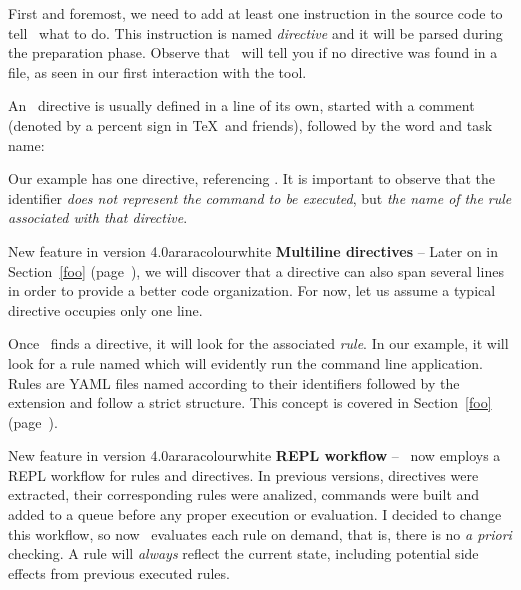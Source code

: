 First and foremost, we need to add at least one instruction in the source code to tell \arara\ what to do. This instruction is named \emph{directive} and it will be parsed during the preparation phase. Observe that \arara\ will tell you if no directive was found in a file, as seen in our first interaction with the tool.

An \arara\ directive is usually defined in a line of its own, started with a comment (denoted by a percent sign in \TeX\ and friends), followed by the word  and task name:


Our example has one directive, referencing . It is important to observe that the  identifier \emph{does not represent the command to be executed}, but \emph{the name of the rule associated with that directive}.

\begin{messagebox}{New feature in version 4.0}{araracolour}{\icinfo}{white}
\textbf{Multiline directives} -- Later on in Section~\ref{foo} (page~\pageref{foo}), we will discover that a directive can also span several lines in order to provide a better code organization. For now, let us assume a typical directive occupies only one line.
\end{messagebox}

Once \arara\ finds a directive, it will look for the associated \emph{rule}. In our example, it will look for a rule named  which will evidently run the  command line application. Rules are YAML files named according to their identifiers followed by the  extension and follow a strict structure. This concept is covered in Section~\ref{foo} (page~\pageref{foo}).

\begin{messagebox}{New feature in version 4.0}{araracolour}{\icattention}{white}
\textbf{\gls{REPL} workflow} -- \arara\ now employs a \gls{REPL} workflow for rules and directives. In previous versions, directives were extracted, their corresponding rules were analized, commands were built and added to a queue before any proper execution or evaluation. I decided to change this workflow, so now \arara\ evaluates each rule on demand, that is, there is no \emph{a priori} checking. A rule will \emph{always} reflect the current state, including potential side effects from previous executed rules.
\end{messagebox}

